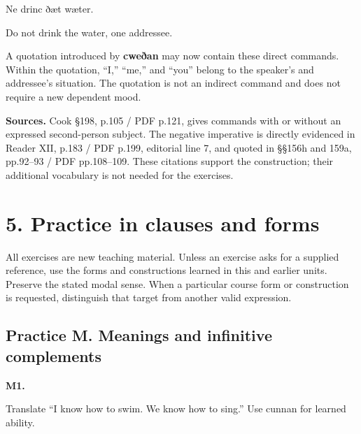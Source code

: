 Ne drinc ðæt wæter.

Do not drink the water, one addressee.

A quotation introduced by \textbf{cweðan} may now contain these direct commands. Within the quotation, “I,” “me,” and “you” belong to the speaker’s and addressee’s situation. The quotation is not an indirect command and does not require a new dependent mood.

\textbf{Sources.} Cook §198, p.105 /\allowbreak{} PDF p.121, gives commands with or without an expressed second-person subject. The negative imperative is directly evidenced in Reader XII, p.183 /\allowbreak{} PDF p.199, editorial line 7, and quoted in §§156h and 159a, pp.92–93 /\allowbreak{} PDF pp.108–109. These citations support the construction; their additional vocabulary is not needed for the exercises.

\section*{5. Practice in clauses and forms}

All exercises are new teaching material. Unless an exercise asks for a supplied reference, use the forms and constructions learned in this and earlier units. Preserve the stated modal sense. When a particular course form or construction is requested, distinguish that target from another valid expression.

\subsection*{Practice M. Meanings and infinitive complements}

\par\begin{minipage}{\linewidth}\raggedright
\textbf{M1.}

Translate “I know how to swim. We know how to sing.” Use cunnan for learned ability.

\end{minipage}\par\addvspace{4pt}


